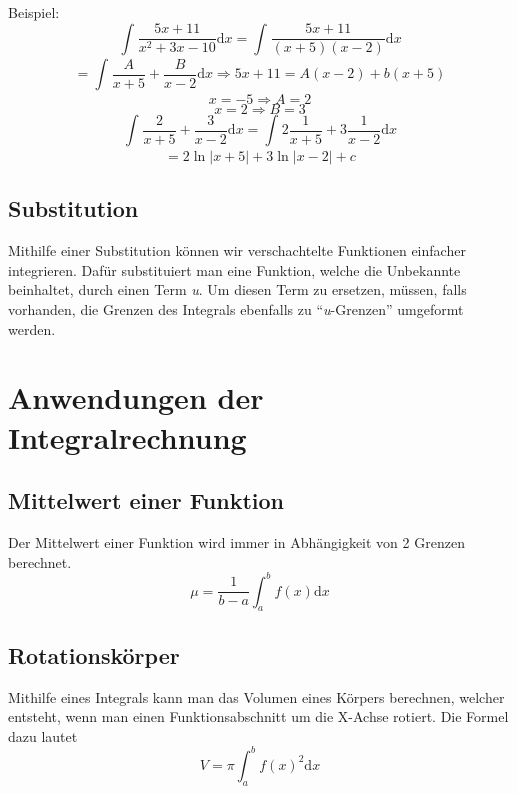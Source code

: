 \documentclass{article}
\begin{document}
Beispiel:
$$ \int_{}^{} \frac{5x+11}{x^{2}+3x-10} \mathrm{d}x = \int_{}^{} \frac{5x+11}{(x+5)(x-2)}  \mathrm{d}x $$
$$= \int_{}^{} \frac{A}{x+5} + \frac{B}{x-2}  \mathrm{d}x \Rightarrow 5x+11 = A(x-2)+b(x+5)$$
$$x = -5 \Rightarrow A = 2$$
$$x=2 \Rightarrow B = 3$$
$$ \int_{}^{} \frac{2}{x+5} + \frac{3}{x-2}  \mathrm{d}x = \int_{}^{} 2 \frac{1}{x+5} + 3 \frac{1}{x-2}  \mathrm{d}x $$
$$=2 \ln |x+5|+ 3\ln|x-2|+c$$


\subsection{Substitution}
Mithilfe einer Substitution können wir verschachtelte Funktionen einfacher integrieren. Dafür substituiert man eine Funktion, welche die Unbekannte beinhaltet, durch einen Term \textit{u}. Um diesen Term zu ersetzen, müssen, falls vorhanden, die Grenzen des Integrals ebenfalls zu ``\textit{u}-Grenzen'' umgeformt werden.

\section{Anwendungen der Integralrechnung}
\subsection{Mittelwert einer Funktion}
Der Mittelwert einer Funktion wird immer in Abhängigkeit von 2 Grenzen berechnet. $$\mu= \frac{1}{b-a} \int_{a}^{b} f(x) \mathrm{d}x  $$
\subsection{Rotationskörper}
Mithilfe eines Integrals kann man das Volumen eines Körpers berechnen, welcher entsteht, wenn man einen Funktionsabschnitt um die X-Achse rotiert.
Die Formel dazu lautet
$$V= \pi \int_{a}^{b} f(x)^{2} \mathrm{d}x $$
\end{document}
